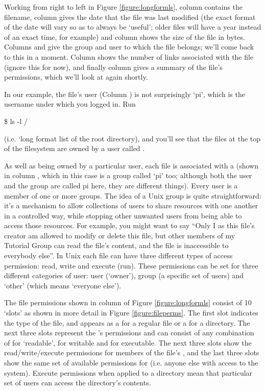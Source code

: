 Working from right to left in Figure \ref{figure:longformls}, column \protect{} contains the filename, column \protect{} gives the date that the file was last modified (the exact format of the date will vary so as to always be `useful'; older files will have a year instead of an exact time, for example) and column \protect{} shows the size of the file in bytes. Columns \protect{} and \protect{} give the group and user to which the file belongs; we'll come back to this in a moment. Column \protect{} shows the number of links associated with the file (ignore this for now), and finally column \protect{} gives a summary of the file's permissions, which we'll look at again shortly. 

In our example, the file's user (Column \protect{}) is not surprisingly `pi', which is the username under which you logged in. Run 

\begin{ttoutenv}
\$ ls -l /
\end{ttoutenv}

(i.e. `long format list of the root directory), and you'll see that the files at the top of the filesystem are owned by a user called . 

As well as being owned by a particular user, each file is associated with a  (shown in column \protect{}, which in this case is a group called `pi' too; although both the user and the group are called pi here, they are different things). Every user is a member of one or more groups. The idea of a Unix group is quite straightforward: it's a mechanism to allow collections of users to share resources with one another in a controlled way, while stopping other unwanted users from being able to access those resources. For example, you might want to say ``Only I as this file's creator am allowed to modify or delete this file, but other members of my Tutorial Group can read the file's content, and the file is inaccessible to everybody else''. In Unix each file can have three different types of access permission: read, write and execute (run). These permissions can be set for three different categories of user: user (`owner'), group (a specific set of users) and `other' (which means `everyone else').

The file permissions shown in column \protect{} of Figure \ref{figure:longformls} consist of 10 `slots' as shown in more detail in Figure \ref{figure:fileperms}. The first slot indicates the type of the file, and appears as a \ttout{-} for a regular file or a  for a directory. The next three slots represent the 's  permissions and can consist of any combination of  for `readable',  for writable and  for executable. The next three slots show the read/write/execute permissions for members of the file's , and the last three slots show the same set of available permissions for  (i.e. anyone else with access to the system). Execute permissions when applied to a directory mean that particular set of users can access the directory's contents.

